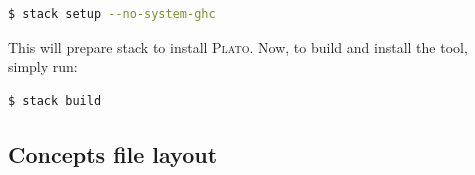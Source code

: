 \documentclass[british,conference,compsoc]{IEEEtran}
\newcommand{\noun}[1]{\textsc{#1}}
\begin{document}
\vspace{-2mm}

\begin{lstlisting}[language=bash]
  $ stack setup --no-system-ghc
\end{lstlisting}

\vspace{-1mm}

This will prepare stack to install \noun{Plato}. Now, to build and install
the tool, simply run:

\vspace{-1mm}

\begin{lstlisting}[language=bash]
  $ stack build
\end{lstlisting}

\vspace{-5mm}

\subsection{Concepts file layout \label{sub:file_layout}}

\vspace{-5mm}
\end{document}
